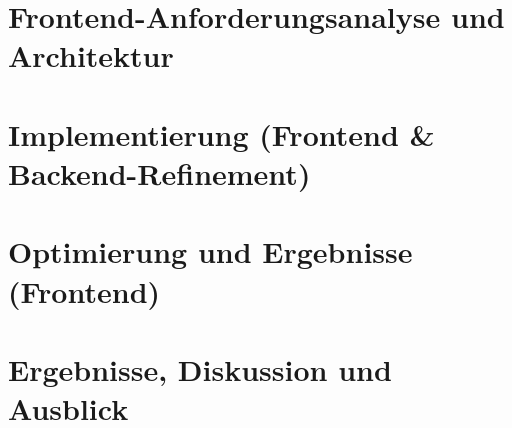 \documentclass[12pt,a4paper,titlepage,listof=totoc,bibliography=totoc,chapteratlists=0pt]{scrreprt}
\begin{document}













\part{Frontend-Anforderungsanalyse und Architektur}





\part{Implementierung (Frontend \& Backend-Refinement)}









\part{Optimierung und Ergebnisse (Frontend)}






\part{Ergebnisse, Diskussion und Ausblick}
\end{document}
